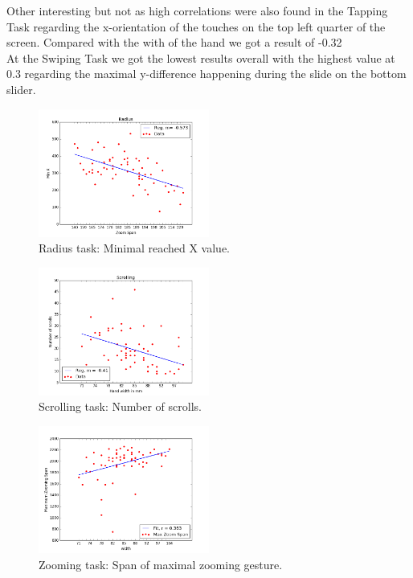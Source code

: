 \documentclass{sigchi}
\begin{document}
Other interesting but not as high correlations were also found in the Tapping Task regarding the x-orientation of the touches on the top left quarter of the screen. Compared with the with of the hand we got a result of -0.32\\
At the Swiping Task we got the lowest results overall with the highest value at 0.3 regarding the maximal y-difference happening during the slide on the bottom slider.

\begin{figure}[ht]
	\centering
  \includegraphics[width=0.5\textwidth]{figures/plotRadius.png}
	\caption{Radius task: Minimal reached X value.}
	\label{plotRadius}
\end{figure}

\begin{figure}[ht]
	\centering
  \includegraphics[width=0.5\textwidth]{figures/plotScrolling.png}
	\caption{Scrolling task: Number of scrolls.}
	\label{plotScrolling}
\end{figure}

\begin{figure}[ht]
	\centering
  \includegraphics[width=0.5\textwidth]{figures/plotZooming.png}
	\caption{Zooming task: Span of maximal zooming gesture.}
	\label{plotZooming}
\end{figure}
\end{document}
